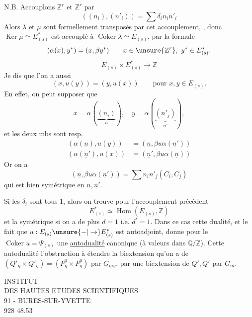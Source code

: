 N.B. Accouplons $\mathbb Z^r$ et $\mathbb Z^r$ par
\[
((n_i),(n'_i))=\sum\delta_i n_i n'_i
\]
Alors $\lambda$ et $\mu$ sont formellement transposés par cet accouplement,
, donc $\operatorname{Ker}\mu\simeq E^*_{(s)}$ est accouplé à $\operatorname{Coker}\lambda\simeq E_{(s)}$, par la formule
\[
(\alpha(x),y^*)=(x,\beta y^*)\qquad x\in\unsure{\mathbb Z^r},\ y^*\in E^*_{(s)}.
\]
\[
E_{(s)}\times E^*_{(s)}\longrightarrow\mathbb Z
\]
 Je dis que l'on a aussi
\[
(x,u(y))=(y,u(x))\qquad\text{pour }x,y\in E_{(s)}.
\]
En effet, on peut supposer que
\[
x=\alpha(\underbrace{(n_i)}_{\underline n}),\quad y=\alpha(\underbrace{(n'_j)}_{\underline n'}),
\]
et les deux mbs sont resp.
\[
\begin{aligned}
(\alpha(\underline n),u(y))&=(\underline n,\beta u\alpha(\underline n'))\\
(\alpha(\underline n'),u(x))&=(\underline n',\beta u\alpha(\underline n))
\end{aligned}
\]
Or on a
\[
(\underline n,\beta u\alpha(\underline n'))=\sum n_i n'_j(C_i,C_j)
\]
qui est bien symétrique en  $\underline n,\underline n'$.

Si les $\delta_i$ sont tous $1$, alors on trouve pour l'accouplement précédent
\[
E^*_{(s)}\simeq\operatorname{Hom}(E_{(s)},\mathbb Z)
\]
et la  symétrique si on a de plus $d=1$ i.e. $d^t=1$.
Dans ce cas cette dualité, et le fait que $u:E_{(s)}\unsure{-|\to}E^*_{(s)}$ est autoadjoint, donne pour le $\operatorname{Coker}u=\Psi_{(s)}$ une \uline{autodualité} canonique (à valeurs dans $\mathbb Q/\mathbb Z$). Cette autodualité  l'obstruction à étendre la biextension qu'on a de $(Q'_\eta\times Q'_\eta)=(P^0_\eta\times P^0_\eta)$ par $G_{m\eta}$, par une biextension de $Q',Q'$ par $G_m$.

\begin{center}
INSTITUT\\
DES HAUTES ETUDES SCIENTIFIQUES\\
91 - BURES-SUR-YVETTE\\
928 48.53
\end{center}

